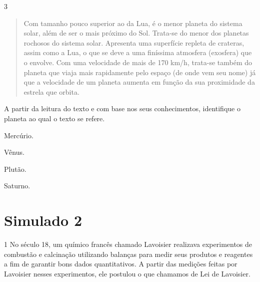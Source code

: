 \num{3}
\begin{quote}
  Com tamanho pouco superior ao da Lua, é o menor planeta do sistema solar, além de ser o mais próximo do Sol. Trata-se do menor
  dos planetas rochosos do sistema solar. Apresenta uma superfície repleta de crateras, assim como a Lua, o que se deve a uma
  finíssima atmosfera (exosfera) que o envolve. Com uma
  velocidade de mais de 170 km/h, trata-se também do
  planeta que viaja mais rapidamente pelo espaço (de onde vem seu nome)
  já que a velocidade de um planeta aumenta em função da sua proximidade
  da estrela que orbita.

\end{quote}

A partir da leitura do texto e com base nos seus conhecimentos,
identifique o planeta ao qual o texto se refere.

\begin{escolha}
\item
  Mercúrio.
\item
  Vênus.
\item
  Plutão.
\item
  Saturno.
\end{escolha}


\chapter{Simulado 2}

\num{1}
  No século 18, um químico francês chamado Lavoisier realizava experimentos de combustão e calcinação utilizando balanças para medir
  seus produtos e reagentes a fim de garantir bons dados quantitativos. A
  partir das medições feitas por Lavoisier nesses experimentos, ele
  postulou o que chamamos de Lei de Lavoisier.

